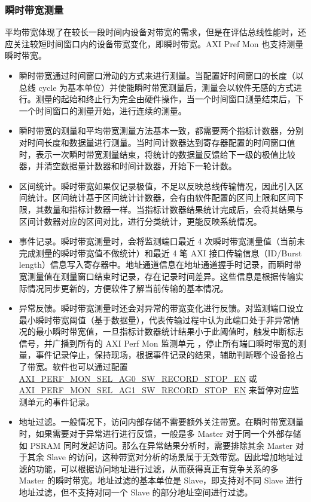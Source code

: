 \documentclass[main\_\_CN.tex]{subfiles}
\begin{document}
\subsubsection{瞬时带宽测量}
平均带宽体现了在较长一段时间内设备对带宽的需求，但是在评估总线性能时，还应关注较短时间窗口内的设备带宽变化，即瞬时带宽。AXI Pref Mon 也支持测量瞬时带宽。
\begin{itemize}
    \item 瞬时带宽通过时间窗口滑动的方式来进行测量。当配置好时间窗口的长度（以总线 cycle 为基本单位）并使能瞬时带宽测量后，测量会以软件无感的方式进行。测量的起始和终止行为完全由硬件操作，当一个时间窗口测量结束后，下一个时间窗口的测量开始，进行连续的测量。
    \item 瞬时带宽的测量和平均带宽测量方法基本一致，都需要两个指标计数器，分别对时间长度和数据量进行测量。当时间计数器达到寄存器配置的时间窗口值时，表示一次瞬时带宽测量结束，将统计的数据量反馈给下一级的极值比较器，并清空数据量计数器和时间计数器，开始下一轮计数。
    \item 区间统计。瞬时带宽如果仅记录极值，不足以反映总线传输情况，因此引入区间统计。区间统计基于区间统计计数器，会有由软件配置的区间上限和区间下限，其数量和指标计数器一样。当指标计数器结果统计完成后，会将其结果与区间计数器对应的区间对比，进行分类统计，更能反映系统情况。
    \item 事件记录。瞬时带宽测量时，会将监测端口最近 4 次瞬时带宽测量值（当前未完成测量的瞬时带宽值不做统计）和最近 4 笔 AXI 接口传输信息（ID/Burst length）信息写入寄存器中。地址通道信息在地址通道握手时记录，而瞬时带宽测量值在测量窗口结束时记录，存在记录时间差异。这些信息是根据传输实际情况同步更新的，方便软件了解当前传输的基本情况。
    \item 异常反馈。瞬时带宽测量时还会对异常的带宽变化进行反馈。对监测端口设立最小瞬时带宽阈值（基于数据量），代表传输过程中认为此端口处于非异常情况的最小瞬时带宽值，一旦指标计数器统计结果小于此阈值时，触发中断标志信号，并广播到所有的 AXI Perf Mon 监测单元 ，停止所有端口瞬时带宽的测量，事件记录停止，保持现场，根据事件记录的结果，辅助判断哪个设备抢占了带宽。软件也可以通过配置 \hyperref[fielddesc:AXIPERFMONSELAG0SWRECORDSTOPEN]{AXI\_PERF\_MON\_SEL\_AG0\_SW\_RECORD\_STOP\_EN} 或 \hyperref[fielddesc:AXIPERFMONSELAG1SWRECORDSTOPEN]{AXI\_PERF\_MON\_SEL\_AG1\_SW\_RECORD\_STOP\_EN} 来暂停对应监测单元的事件记录。
    \item 地址过滤。一般情况下，访问内部存储不需要额外关注带宽。在瞬时带宽测量时，如果需要对于异常进行进行反馈，一般是多 Master 对于同一个外部存储如 PSRAM 同时发起访问。那么在异常结果分析时，需要排除其余 Master 对于其余 Slave 的访问，这种带宽对分析的场景属于无效带宽。因此增加地址过滤的功能，可以根据访问地址进行过滤，从而获得真正有竞争关系的多 Master 的瞬时带宽。地址过滤的基本单位是 Slave，即支持对不同 Slave 进行地址过滤，但不支持对同一个 Slave 的部分地址空间进行过滤。

\end{itemize}
\end{document}
